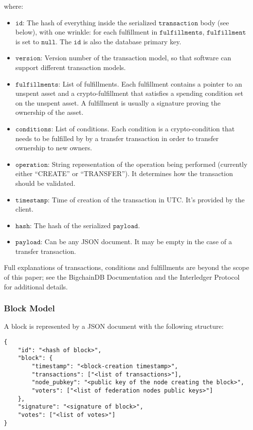 where:

\begin{itemize}
 \item $\mathtt{id}$: The hash of everything inside the serialized $\mathtt{transaction}$ body (see below), with one wrinkle: for each fulfillment in $\mathtt{fulfillments}$, $\mathtt{fulfillment}$ is set to $\mathtt{null}$. The $\mathtt{id}$ is also the database primary key.
 \item $\mathtt{version}$: Version number of the transaction model, so that software can support different transaction models.
 \item $\mathtt{fulfillments}$: List of fulfillments. Each fulfillment contains a pointer to an unspent asset and a crypto-fulfillment that satisfies a spending condition set on the unspent asset. A fulfillment is usually a signature proving the ownership of the asset.
 \item $\mathtt{conditions}$: List of conditions. Each condition is a crypto-condition that needs to be fulfilled by by a transfer transaction in order to transfer ownership to new owners.
 \item $\mathtt{operation}$:  String representation of the operation being performed (currently either ``CREATE'' or ``TRANSFER''). It determines how the transaction should be validated.
 \item $\mathtt{timestamp}$: Time of creation of the transaction in UTC. It's provided by the client.
 \item $\mathtt{hash}$: The hash of the serialized $\mathtt{payload}$.
 \item $\mathtt{payload}$: Can be any JSON document. It may be empty in the case of a transfer transaction.
\end{itemize}

Full explanations of transactions, conditions and fulfillments are beyond the scope of this paper; see the BigchainDB Documentation \cite{bigchaindb_doc} and the Interledger Protocol \cite{thomas2015interledger} for additional details.


\subsubsection{Block Model}
A block is represented by a JSON document with the following structure:

\begin{lstlisting}[style=json]
{
    "id": "<hash of block>",
    "block": {
        "timestamp": "<block-creation timestamp>",
        "transactions": ["<list of transactions>"],
        "node_pubkey": "<public key of the node creating the block>",
        "voters": ["<list of federation nodes public keys>"]
    },
    "signature": "<signature of block>",
    "votes": ["<list of votes>"]
}
\end{lstlisting}


